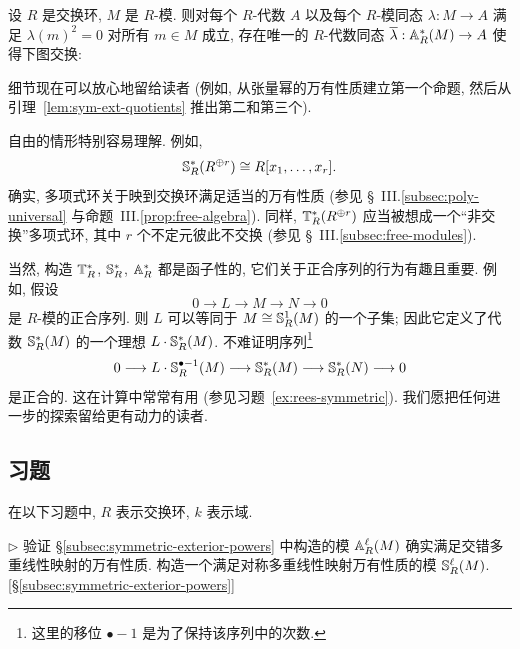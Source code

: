 \begin{proposition}\label{prop:exterior-algebra-univ}
设 $R$ 是交换环, $M$ 是 $R$-模. 则对每个 $R$-代数 $A$ 以及每个 $R$-模同态 $\lambda:M\to A$ 满足 $\lambda(m)^2=0$ 对所有 $m\in M$ 成立, 存在唯一的 $R$-代数同态 $\overline{\lambda}:\mathbb{A}_R^*(M)\to A$ 使得下图交换:
\begin{center}
\end{center}
\end{proposition}

细节现在可以放心地留给读者 (例如, 从张量幂的万有性质建立第一个命题, 然后从引理~\ref{lem:sym-ext-quotients} 推出第二和第三个).

\begin{example}\label{ex:free-symmetric-poly}
自由的情形特别容易理解. 例如,
\[
\mathbb{S}_R^*(R^{\oplus r})\cong R[x_1,\dots,x_r].
\]
确实, 多项式环关于映到交换环满足适当的万有性质 (参见 \S~III.\ref{subsec:poly-universal} 与命题~III.\ref{prop:free-algebra}). 同样, $\mathbb{T}_R^*(R^{\oplus r})$ 应当被想成一个``非交换''多项式环, 其中 $r$ 个不定元彼此不交换 (参见 \S~III.\ref{subsec:free-modules}).
\end{example}

当然, 构造 $\mathbb{T}_R^*$, $\mathbb{S}_R^*$, $\mathbb{A}_R^*$ 都是函子性的, 它们关于正合序列的行为有趣且重要. 例如, 假设
\[
0\longrightarrow L\longrightarrow M\longrightarrow N\longrightarrow 0
\]
是 $R$-模的正合序列. 则 $L$ 可以等同于 $M\cong\mathbb{S}_R^1(M)$ 的一个子集; 因此它定义了代数 $\mathbb{S}_R^*(M)$ 的一个理想 $L\cdot\mathbb{S}_R^*(M)$. 不难证明序列\footnote{这里的移位 $\bullet-1$ 是为了保持该序列中的次数.}
\[
0\longrightarrow L\cdot\mathbb{S}_R^{\bullet-1}(M)\longrightarrow\mathbb{S}_R^*(M)\longrightarrow\mathbb{S}_R^*(N)\longrightarrow 0
\]
是正合的. 这在计算中常常有用 (参见习题~\ref{ex:rees-symmetric}). 我们愿把任何进一步的探索留给更有动力的读者.

\subsection*{习题}
{}

在以下习题中, $R$ 表示交换环, $k$ 表示域.

\begin{prob}\label{ex:exterior-universal-property}
$\triangleright$ 验证 §\ref{subsec:symmetric-exterior-powers} 中构造的模 $\mathbb{A}_R^\ell(M)$ 确实满足交错多重线性映射的万有性质. 构造一个满足对称多重线性映射万有性质的模 $\mathbb{S}_R^\ell(M)$. [§\ref{subsec:symmetric-exterior-powers}]
\end{prob}

